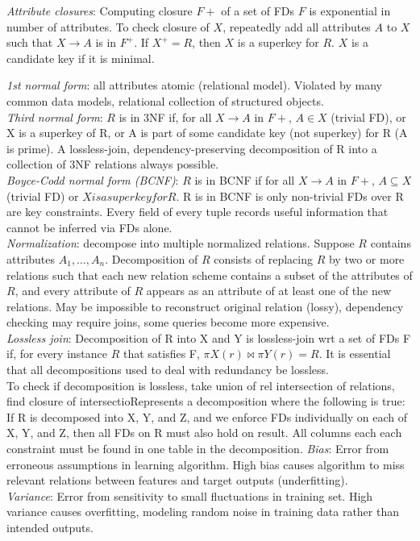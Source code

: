 \documentclass[10pt,landscape]{article}
\begin{document}
\begin{multicols}{3}
{\textit{Attribute closures}: Computing closure $F+$ of a set of FDs $F$ is exponential in number of attributes. To check closure of $X$, repeatedly add all attributes $A$ to $X$ such that $X \rightarrow A$ is in $F^+$. If $X^+ = R$, then $X$ is a superkey for $R$. $X$ is a candidate key if it is minimal.

\textit{1st normal form}: all attributes atomic (relational model). Violated by many common data models, relational collection of structured objects. \\
\textit{Third normal form}: $R$ is in 3NF if, for all $X \rightarrow A$ in $F+$, $A \in X$ (trivial FD), or X is a superkey of R, or A is part of some candidate key (not superkey) for R (A is prime). A lossless-join, dependency-preserving decomposition of R into a collection of 3NF relations always possible. \\
\textit{Boyce-Codd normal form (BCNF)}: $R$ is in BCNF if for all $X \rightarrow A$ in $F+$, $A \subseteq X$ (trivial FD) or $X is a superkey for R$. R is in BCNF is only non-trivial FDs over R are key constraints. Every field of every tuple records useful information that cannot be inferred via FDs alone. \\
\textit{Normalization}: decompose into multiple normalized relations. Suppose $R$ contains attributes $A_1, \ldots, A_n$. Decomposition of $R$ consists of replacing $R$ by two or more relations such that each new relation scheme contains a subset of the attributes of $R$, and every attribute of $R$ appears as an attribute of at least one of the new relations. May be impossible to reconstruct original relation (lossy), dependency checking may require joins, some queries become more expensive. \\
\textit{Lossless join}: Decomposition of R into X and Y is lossless-join wrt a set of FDs F if, for every instance $R$ that satisfies F, $\pi X(r) \bowtie \pi Y(r) = R$. It is essential that all decompositions used to deal with redundancy be lossless. \\
To check if decomposition  is lossless, take union of rel intersection of relations, find closure of intersectioRepresents a decomposition where the following is true: If R is decomposed into X, Y, and Z, and we enforce FDs individually on each of X, Y, and Z, then all FDs on R must also hold on result. All columns each each constraint must be found in one table in the decomposition. \textit{Bias}: Error from erroneous assumptions in learning algorithm. High bias causes algorithm to miss relevant relations between features and target outputs (underfitting). \\
\textit{Variance}: Error from sensitivity to small fluctuations in training set. High variance causes overfitting, modeling random noise in training data rather than intended outputs.

}
\end{multicols}
\end{document}
